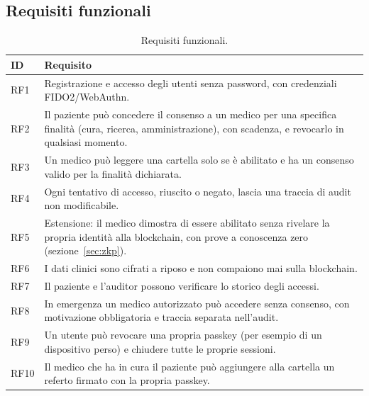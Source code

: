 \subsection{Requisiti funzionali}
\begin{table}[H]
\centering\small
\begin{tabular}{@{}l p{}@{}}
\toprule
ID & Requisito\\
\midrule
RF1 & Registrazione e accesso degli utenti senza password, con credenziali FIDO2/WebAuthn.\\
RF2 & Il paziente può concedere il consenso a un medico per una specifica finalità (cura, ricerca, amministrazione), con scadenza, e revocarlo in qualsiasi momento.\\
RF3 & Un medico può leggere una cartella solo se è abilitato e ha un consenso valido per la finalità dichiarata.\\
RF4 & Ogni tentativo di accesso, riuscito o negato, lascia una traccia di audit non modificabile.\\
RF5 & Estensione: il medico dimostra di essere abilitato senza rivelare la propria identità alla blockchain, con prove a conoscenza zero (sezione~\ref{sec:zkp}).\\
RF6 & I dati clinici sono cifrati a riposo e non compaiono mai sulla blockchain.\\
RF7 & Il paziente e l'auditor possono verificare lo storico degli accessi.\\
RF8 & In emergenza un medico autorizzato può accedere senza consenso, con motivazione obbligatoria e traccia separata nell'audit.\\
RF9 & Un utente può revocare una propria passkey (per esempio di un dispositivo perso) e chiudere tutte le proprie sessioni.\\
RF10 & Il medico che ha in cura il paziente può aggiungere alla cartella un referto firmato con la propria passkey.\\
\bottomrule
\end{tabular}
\caption{Requisiti funzionali.}
\end{table}

